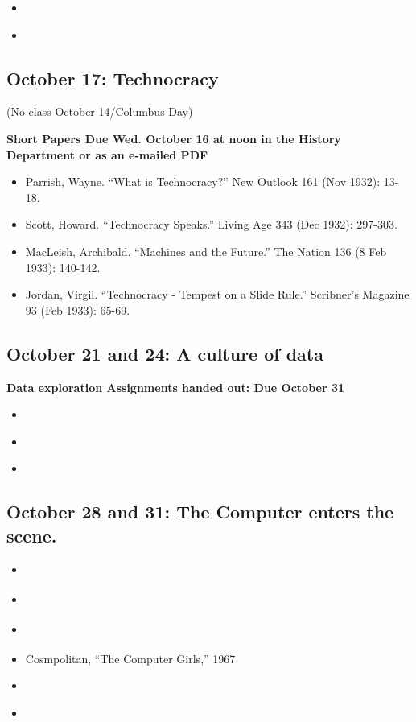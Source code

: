 \begin{itemize}
\itemsep1pt\parskip0pt
\item
  \cite{taylor_principles_2006}
\item
  \cite[Chapters 5 and 6]{meyer_five_1981}
\end{itemize}

\subsection{October 17: Technocracy}

(No class October 14/Columbus Day)

\textbf{Short Papers Due Wed. October 16 at noon in the History
Department or as an e-mailed PDF}

\begin{itemize}
\itemsep1pt\parskip0pt
\item
  Parrish, Wayne. ``What is Technocracy?'' New Outlook 161 (Nov 1932):
  13-18.
\item
  Scott, Howard. ``Technocracy Speaks.'' Living Age 343 (Dec 1932):
  297-303.
\item
  MacLeish, Archibald. ``Machines and the Future.'' The Nation 136 (8
  Feb 1933): 140-142.
\item
  Jordan, Virgil. ``Technocracy - Tempest on a Slide Rule.'' Scribner's
  Magazine 93 (Feb 1933): 65-69.
\end{itemize}

\subsection{October 21 and 24: A culture of data}

\textbf{Data exploration Assignments handed out: Due October 31}

\begin{itemize}
\itemsep1pt\parskip0pt
\item
  \cite[Chapters 5 and 6]{igo_averaged_2007}
\item
  \cite[pp. 1-122]{lemann_big_1999}
\item
  \cite[pp 193-229]{ohmer_george_2006}
\end{itemize}

\subsection{October 28 and 31: The Computer enters the scene.}

\begin{itemize}
\itemsep1pt\parskip0pt
\item
  \cite{bush_as_1945}
\item
  \cite{bush_memex_1991}
\item
  \cite{lubar_not_1992}
\item
  Cosmpolitan, ``The Computer Girls,'' 1967
\item
  \cite[Chapter TBD]{ensmenger_computer_2010}
\item
  \cite{light_when_1999}
\end{itemize}

